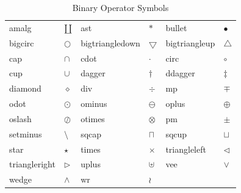 \begin{table}[tbhp]
\caption{Binary Operator Symbols}
\label{tab:binop}
\centering
\begin{tabular}{llllll}
\gls{amalg} & $\amalg$ &
\gls{ast} & $\ast$ &
\gls{bullet} & $\bullet$ \\
\gls{bigcirc} & $\bigcirc$ &
\gls{bigtriangledown} & $\bigtriangledown$ &
\gls{bigtriangleup} & $\bigtriangleup$ \\
\gls{cap} & $\cap$ &
\gls{cdot} & $\cdot$ &
\gls{circ} & $\circ$ \\
\gls{cup} & $\cup$ &
\gls{dagger} & $\dagger$ &
\gls{ddagger} & $\ddagger$ \\
\gls{diamond} & $\diamond$ &
\gls{div} & $\div$ &
\gls{mp} & $\mp$ \\
\gls{odot} & $\odot$ &
\gls{ominus} & $\ominus$ &
\gls{oplus} & $\oplus$ \\
\gls{oslash} & $\oslash$ &
\gls{otimes} & $\otimes$ &
\gls{pm} & $\pm$ \\
\gls{setminus} & $\setminus$ &
\gls{sqcap} & $\sqcap$ &
\gls{sqcup} & $\sqcup$ \\
\gls{star} & $\star$ &
\gls{times} & $\times$ &
\gls{triangleleft} & $\triangleleft$ \\
\gls{triangleright} & $\triangleright$ &
\gls{uplus} & $\uplus$ &
\gls{vee} & $\vee$ \\
\gls{wedge} & $\wedge$ &
\gls{wr} & $\wr$
\end{tabular}
\end{table}

